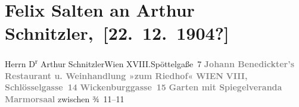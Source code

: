 

         
         \renewcommand{\erwaehntePersonen}{Personen: Johann Benedickter, Anna Katharina Rehmann, Ottilie Salten}
         \renewcommand{\erwaehnteOrte}{Orte: Edmund-Weiß-Gasse 7, Riedhof, Schlösselgasse, Wickenburggasse, Wien, XVIII., Währing}
         \renewcommand{\erwaehnteWerke}{Werke: Symphonie Nr. 3 D-Moll}
               \section[ Felix Salten an Arthur Schnitzler, {[}22. 12. 1904?{]}]{ Felix Salten an Arthur Schnitzler, {[}22. 12. 1904?{]}}\nopagebreak{}\rehead{ }\begin{ledgroupsized}[t]{13cm}\normalsize\beginnumbering \toendnotes[C]{\smallbreak\pagebreak[2]} 
\toendnotes[C]{\smallbreak}\pstart{}{\pb}Herrn D\textsuperscript{r} Arthur Schnitzler\pend{}\pstart{}Wien XVIII.\pend{}\pstart{}Spöttelgaße 7\pend{}{\bigskip}\pstart
           \noindent{}\centering{}{\pb}\textcolor{gray}{\textbf{Johann Benedickter’s}}\pend
           \pstart
           \noindent{}\centering{}\textcolor{gray}{\textbf{Restaurant u. Weinhandlung »zum Riedhof«}}\pend
           \pstart
           \noindent{}\centering{}\textcolor{gray}{\textbf{WIEN}}\pend
           \pstart
           \noindent{}\centering{}\textcolor{gray}{\textbf{VIII, Schlösselgasse 14}}\pend
           \pstart
           \noindent{}\centering{}\textcolor{gray}{\textbf{Wickenburggasse 15}}\pend
           \pstart
           \noindent{}\centering{}\textcolor{gray}{\textbf{Garten mit Spiegelveranda}}\pend
           \pstart
           \noindent{}\centering{}\textcolor{gray}{\textbf{Marmorsaal}}\pend
           \pstart
           zwischen ¾ 11–11\pend
           \pstart

\end{ledgroupsized}
